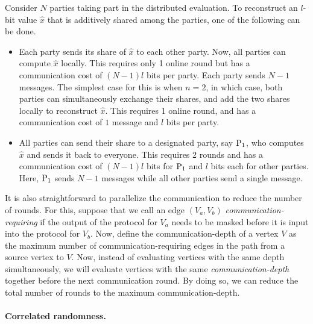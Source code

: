 Consider $N$ parties taking part in the distributed evaluation. To reconstruct an $l$-bit value $\hat{x}$ that is additively shared among the parties, one of the following can be done.
\begin{itemize}
  \item Each party sends its share of $\hat{x}$ to each other party. Now, all parties can compute $\hat{x}$ locally. This requires only 1 online round but has a communication cost of $(N-1)l$ bits per party. Each party sends $N-1$ messages. The simplest case for this is when $n=2$, in which case, both parties can simultaneously exchange their shares, and add the two shares locally to reconstruct $\hat{x}$. This requires 1 online round, and has a communication cost of $1$ message and $l$ bits per party. 

  \item All parties can send their share to a designated party, say $\textnormal{P}_1$, who computes $\hat{x}$ and sends it back to everyone. This requires 2 rounds and has a communication cost of $(N-1)l$ bits for $\textnormal{P}_1$ and $l$ bits each for other parties. Here, $\textnormal{P}_1$ sends $N-1$ messages while all other parties send a single message.
\end{itemize}


It is also straightforward to parallelize the communication to reduce the number of rounds. For this, suppose that we call an edge $(V_a, V_b)$ \textit{communication-requiring} if the output of the protocol for $V_a$ needs to be masked before it is input into the protocol for $V_b$. Now, define the communication-depth of a vertex $V$ as the maximum number of communication-requiring edges in the path from a source vertex to $V$. Now, instead of evaluating vertices with the same depth simultaneously, we will evaluate vertices with the same \textit{communication-depth} together before the next communication round. By doing so, we can reduce the total number of rounds to the maximum communication-depth.


\paragraph{Correlated randomness.}


